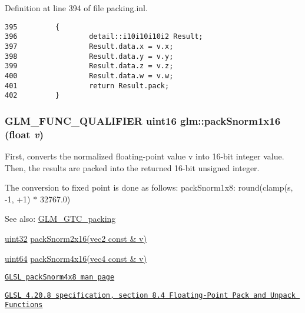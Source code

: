 Definition at line 394 of file packing.inl.

\begin{Code}\begin{verbatim}395         {
396                 detail::i10i10i10i2 Result;
397                 Result.data.x = v.x;
398                 Result.data.y = v.y;
399                 Result.data.z = v.z;
400                 Result.data.w = v.w;
401                 return Result.pack; 
402         }
\end{verbatim}
\end{Code}


\hypertarget{group__gtc__packing_gc29411d6c0f6ed0fe9f0396dfe92e0e8}{
\subsubsection[packSnorm1x16]{\setlength{\rightskip}{0pt plus 5cm}GLM\_\-FUNC\_\-QUALIFIER uint16 glm::packSnorm1x16 (float {\em v})}}
\label{group__gtc__packing_gc29411d6c0f6ed0fe9f0396dfe92e0e8}


First, converts the normalized floating-point value v into 16-bit integer value. Then, the results are packed into the returned 16-bit unsigned integer.

The conversion to fixed point is done as follows: packSnorm1x8: round(clamp(s, -1, +1) $\ast$ 32767.0)

\begin{Desc}
\item[See also:]\hyperlink{group__gtc__packing}{GLM\_\-GTC\_\-packing} 

\hyperlink{group__gtc__type__precision_g202b6a53c105fcb7e531f9b443518451}{uint32} \hyperlink{group__core__func__packing_g0c8005de240d6c4ca3d16c7bee25c622}{packSnorm2x16(vec2 const \& v)} 

\hyperlink{group__gtc__type__precision_ge3632bf9b37da66233d78930dd06378a}{uint64} \hyperlink{group__gtc__packing_g9b237d7c66b7a71964e6d1f4dc06539f}{packSnorm4x16(vec4 const \& v)} 

\href{http://www.opengl.org/sdk/docs/manglsl/xhtml/packSnorm4x8.xml}{\tt GLSL packSnorm4x8 man page} 

\href{http://www.opengl.org/registry/doc/GLSLangSpec.4.20.8.pdf}{\tt GLSL 4.20.8 specification, section 8.4 Floating-Point Pack and Unpack Functions} \end{Desc}


